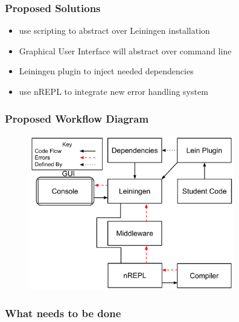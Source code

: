 \documentclass{beamer}
\begin{document}
\begin{frame}
\frametitle{Proposed Solutions}
	\begin{itemize}
		\item use scripting to abstract over Leiningen installation
		\item Graphical User Interface will abstract over command line
		\item Leiningen plugin to inject needed dependencies
		\item use nREPL to integrate new error handling system
	\end{itemize}
\end{frame}

\begin{frame}[fragile]
\frametitle{Proposed Workflow Diagram}
\begin{figure}[h]
 \includegraphics[width=9cm]{../OurErrorHandlingSystem.pdf}
 \centering
\end{figure}
\end{frame}

\begin{frame}
\frametitle{What needs to be done}
\end{frame}
\end{document}
